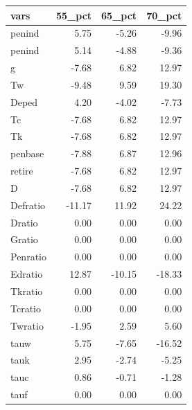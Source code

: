 \begin{tabular}{lrrr}
  \hline
vars & 55\_pct & 65\_pct & 70\_pct \\ 
  \hline
penind & 5.75 & -5.26 & -9.96 \\ 
  penind & 5.14 & -4.88 & -9.36 \\ 
  g & -7.68 & 6.82 & 12.97 \\ 
  Tw & -9.48 & 9.59 & 19.30 \\ 
  Deped & 4.20 & -4.02 & -7.73 \\ 
  Tc & -7.68 & 6.82 & 12.97 \\ 
  Tk & -7.68 & 6.82 & 12.97 \\ 
  penbase & -7.88 & 6.87 & 12.96 \\ 
  retire & -7.68 & 6.82 & 12.97 \\ 
  D & -7.68 & 6.82 & 12.97 \\ 
  Defratio & -11.17 & 11.92 & 24.22 \\ 
  Dratio & 0.00 & 0.00 & 0.00 \\ 
  Gratio & 0.00 & 0.00 & 0.00 \\ 
  Penratio & 0.00 & 0.00 & 0.00 \\ 
  Edratio & 12.87 & -10.15 & -18.33 \\ 
  Tkratio & 0.00 & 0.00 & 0.00 \\ 
  Tcratio & 0.00 & 0.00 & 0.00 \\ 
  Twratio & -1.95 & 2.59 & 5.60 \\ 
  tauw & 5.75 & -7.65 & -16.52 \\ 
  tauk & 2.95 & -2.74 & -5.25 \\ 
  tauc & 0.86 & -0.71 & -1.28 \\ 
  tauf & 0.00 & 0.00 & 0.00 \\ 
   \hline
\end{tabular}
